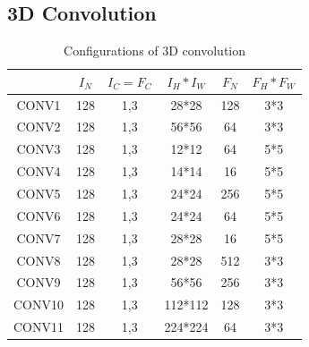 \subsection{3D Convolution}
\label{3dconvexp}
\begin{table}[]
\caption{Configurations of 3D convolution}
\label{tab:3dconvconfigs}
\begin{tabular}{c|ccccc}
\hline
& $I_N$ & $I_C=F_C$ & $I_H*I_W$ & $F_N$ & $F_H*F_W$ \\
\hline
CONV1 & 128  & 1,3       & 28*28     & 128  & 3*3       \\
CONV2 & 128  & 1,3       & 56*56     & 64   & 3*3       \\
CONV3 & 128  & 1,3       & 12*12     & 64   & 5*5       \\
CONV4 & 128  & 1,3       & 14*14     & 16   & 5*5       \\
CONV5 & 128  & 1,3       & 24*24    & 256  & 5*5       \\
CONV6 & 128  & 1,3       & 24*24     & 64   & 5*5       \\
CONV7 & 128  & 1,3       & 28*28     & 16   & 5*5       \\
CONV8 & 128  & 1,3       & 28*28     & 512   & 3*3       \\
CONV9 & 128  & 1,3       & 56*56     & 256  & 3*3       \\
CONV10 & 128  & 1,3       & 112*112     & 128   & 3*3       \\
CONV11 & 128  & 1,3       & 224*224     & 64   & 3*3      \\
\hline
\end{tabular}
\end{table}

